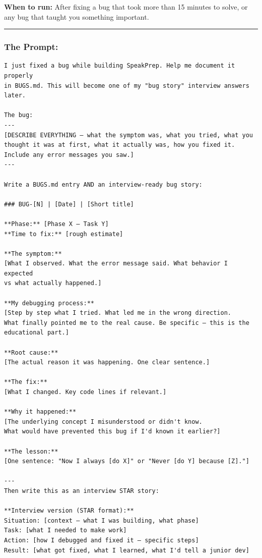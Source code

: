 \documentclass[
  11pt,
]{article}
\begin{document}
\textbf{When to run:} After fixing a bug that took more than 15 minutes
to solve, or any bug that taught you something important.

\begin{center}\rule{0.5\linewidth}{0.5pt}\end{center}

\hypertarget{the-prompt-3}{%
\subsubsection{The Prompt:}\label{the-prompt-3}}

\begin{lstlisting}
I just fixed a bug while building SpeakPrep. Help me document it properly
in BUGS.md. This will become one of my "bug story" interview answers later.

The bug:
---
[DESCRIBE EVERYTHING — what the symptom was, what you tried, what you
thought it was at first, what it actually was, how you fixed it.
Include any error messages you saw.]
---

Write a BUGS.md entry AND an interview-ready bug story:

### BUG-[N] | [Date] | [Short title]

**Phase:** [Phase X — Task Y]
**Time to fix:** [rough estimate]

**The symptom:**
[What I observed. What the error message said. What behavior I expected
vs what actually happened.]

**My debugging process:**
[Step by step what I tried. What led me in the wrong direction.
What finally pointed me to the real cause. Be specific — this is the
educational part.]

**Root cause:**
[The actual reason it was happening. One clear sentence.]

**The fix:**
[What I changed. Key code lines if relevant.]

**Why it happened:**
[The underlying concept I misunderstood or didn't know.
What would have prevented this bug if I'd known it earlier?]

**The lesson:**
[One sentence: "Now I always [do X]" or "Never [do Y] because [Z]."]

---
Then write this as an interview STAR story:

**Interview version (STAR format):**
Situation: [context — what I was building, what phase]
Task: [what I needed to make work]
Action: [how I debugged and fixed it — specific steps]
Result: [what got fixed, what I learned, what I'd tell a junior dev]
\end{lstlisting}
\end{document}
